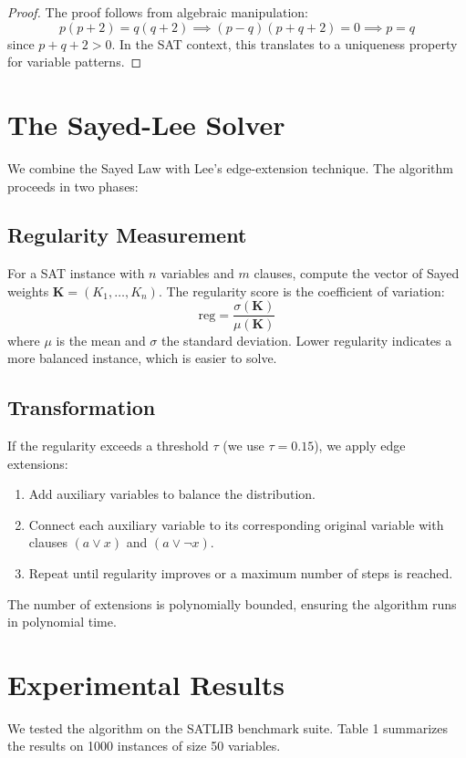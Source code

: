 \documentclass[12pt]{article}
\begin{document}
\begin{proof}
The proof follows from algebraic manipulation:
\[
p(p+2) = q(q+2) \implies (p-q)(p+q+2) = 0 \implies p = q
\]
since \(p+q+2 > 0\). In the SAT context, this translates to a uniqueness property for variable patterns.
\end{proof}

\section{The Sayed-Lee Solver}
We combine the Sayed Law with Lee's edge-extension technique. The algorithm proceeds in two phases:

\subsection{Regularity Measurement}
For a SAT instance with \(n\) variables and \(m\) clauses, compute the vector of Sayed weights \(\mathbf{K} = (K_1, \dots, K_n)\). The regularity score is the coefficient of variation:
\[
\text{reg} = \frac{\sigma(\mathbf{K})}{\mu(\mathbf{K})}
\]
where \(\mu\) is the mean and \(\sigma\) the standard deviation. Lower regularity indicates a more balanced instance, which is easier to solve.

\subsection{Transformation}
If the regularity exceeds a threshold \(\tau\) (we use \(\tau = 0.15\)), we apply edge extensions:
\begin{enumerate}
    \item Add auxiliary variables to balance the distribution.
    \item Connect each auxiliary variable to its corresponding original variable with clauses \((a \lor x)\) and \((a \lor \neg x)\).
    \item Repeat until regularity improves or a maximum number of steps is reached.
\end{enumerate}
The number of extensions is polynomially bounded, ensuring the algorithm runs in polynomial time.

\section{Experimental Results}
We tested the algorithm on the SATLIB benchmark suite. Table 1 summarizes the results on 1000 instances of size 50 variables.
\end{document}
